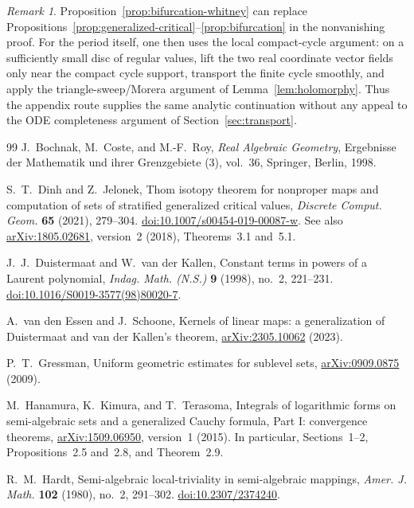 \documentclass[11pt]{article}
\numberwithin{equation}{section}
\theoremstyle{definition}
\theoremstyle{remark}
\newtheorem{remark}[theorem]{Remark}
\newcommand{\arxiv}[1]{\href{https://arxiv.org/abs/#1}{arXiv:#1}}
\begin{document}
\begin{remark}
Proposition~\ref{prop:bifurcation-whitney} can replace
Propositions~\ref{prop:generalized-critical}--\ref{prop:bifurcation} in
the nonvanishing proof.  For the period itself, one then uses the local
compact-cycle argument: on a sufficiently small disc
of regular values, lift the two real coordinate vector fields only near the
compact cycle support, transport the finite cycle smoothly, and apply the
triangle-sweep/Morera argument of Lemma~\ref{lem:holomorphy}.  Thus the
appendix route supplies the same analytic continuation without any appeal to
the ODE completeness argument of Section~\ref{sec:transport}.
\end{remark}

\begin{thebibliography}{99}
J.~Bochnak, M.~Coste, and M.-F.~Roy,
\emph{Real Algebraic Geometry}, Ergebnisse der Mathematik und ihrer
Grenzgebiete (3), vol.~36, Springer, Berlin, 1998.

S.~T.~Dinh and Z.~Jelonek,
Thom isotopy theorem for nonproper maps and computation of sets of
stratified generalized critical values,
\emph{Discrete Comput. Geom.} \textbf{65} (2021), 279--304.
\href{https://doi.org/10.1007/s00454-019-00087-w}{doi:10.1007/s00454-019-00087-w}.
See also \arxiv{1805.02681}, version~2 (2018), Theorems~3.1 and~5.1.

J.~J.~Duistermaat and W.~van der Kallen,
Constant terms in powers of a Laurent polynomial,
\emph{Indag. Math. (N.S.)} \textbf{9} (1998), no.~2, 221--231.
\href{https://doi.org/10.1016/S0019-3577(98)80020-7}{doi:10.1016/S0019-3577(98)80020-7}.

A.~van den Essen and J.~Schoone,
Kernels of linear maps: a generalization of Duistermaat and van der
Kallen's theorem, \arxiv{2305.10062} (2023).

P.~T.~Gressman,
Uniform geometric estimates for sublevel sets,
\arxiv{0909.0875} (2009).

M.~Hanamura, K.~Kimura, and T.~Terasoma,
Integrals of logarithmic forms on semi-algebraic sets and a generalized
Cauchy formula, Part I: convergence theorems,
\arxiv{1509.06950}, version~1 (2015).
In particular, Sections~1--2, Propositions~2.5 and~2.8,
and Theorem~2.9.

R.~M.~Hardt,
Semi-algebraic local-triviality in semi-algebraic mappings,
\emph{Amer. J. Math.} \textbf{102} (1980), no.~2, 291--302.
\href{https://doi.org/10.2307/2374240}{doi:10.2307/2374240}.


\end{thebibliography}
\end{document}
